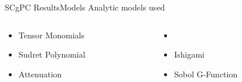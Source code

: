 \documentclass{beamer}
\begin{document}
\begin{frame}{SCgPC Results}{Models}\vspace{-20pt}
  \vfill
  Analytic models used
  \vfill
  \begin{columns}
    \begin{column}{0.5\textwidth}
  \vfill
      \begin{itemize}
        \item Tensor Monomials
  \vfill
        \item Sudret Polynomial
  \vfill
        \item \color{red}Attenuation\color{black}
      \end{itemize}
  \vfill
    \end{column}
    \begin{column}{0.5\textwidth}
  \vfill
      \begin{itemize}
        \item \color{red}{Gauss Peak}\color{black}
  \vfill
        \item Ishigami
  \vfill
        \item Sobol G-Function
      \end{itemize}
  \vfill
    \end{column}
  \end{columns}
  \vfill
\end{frame}
\end{document}
